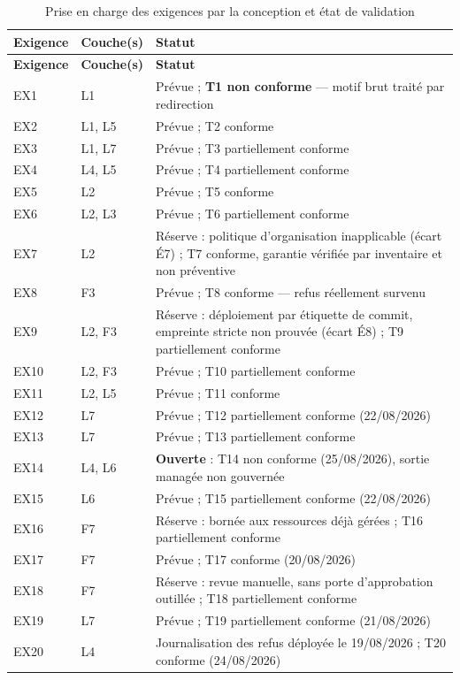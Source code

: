 \begingroup
\small
\setlength{\tabcolsep}{4pt}
\setlength{\LTpre}{4pt}
\setlength{\LTpost}{4pt}
\begin{longtable}{|P{1.3cm}|P{1.9cm}|P{11.8cm}|}
\caption[Prise en charge des exigences]{Prise en charge des exigences par la conception et état de validation}
\label{tab:couverture-exigences} \\
\hline
\textbf{Exigence} & \textbf{Couche(s)} & \textbf{Statut} \\
\hline
\endfirsthead
\hline
\textbf{Exigence} & \textbf{Couche(s)} & \textbf{Statut} \\
\hline
\endhead
EX1 & L1 & Prévue ; \textbf{T1 non conforme} --- motif brut traité par redirection \\ \hline
EX2 & L1, L5 & Prévue ; T2 conforme \\ \hline
EX3 & L1, L7 & Prévue ; T3 partiellement conforme \\ \hline
EX4 & L4, L5 & Prévue ; T4 partiellement conforme \\ \hline
EX5 & L2 & Prévue ; T5 conforme \\ \hline
EX6 & L2, L3 & Prévue ; T6 partiellement conforme \\ \hline
EX7 & L2 & Réserve : politique d'organisation inapplicable (écart É7) ; T7 conforme, garantie vérifiée par inventaire et non préventive \\ \hline
EX8 & F3 & Prévue ; T8 conforme --- refus réellement survenu \\ \hline
EX9 & L2, F3 & Réserve : déploiement par étiquette de commit, empreinte stricte non prouvée (écart É8) ; T9 partiellement conforme \\ \hline
EX10 & L2, F3 & Prévue ; T10 partiellement conforme \\ \hline
EX11 & L2, L5 & Prévue ; T11 conforme \\ \hline
EX12 & L7 & Prévue ; T12 partiellement conforme (22/08/2026) \\ \hline
EX13 & L7 & Prévue ; T13 partiellement conforme \\ \hline
EX14 & L4, L6 & \textbf{Ouverte} : T14 non conforme (25/08/2026), sortie managée non gouvernée \\ \hline
EX15 & L6 & Prévue ; T15 partiellement conforme (22/08/2026) \\ \hline
EX16 & F7 & Réserve : bornée aux ressources déjà gérées ; T16 partiellement conforme \\ \hline
EX17 & F7 & Prévue ; T17 conforme (20/08/2026) \\ \hline
EX18 & F7 & Réserve : revue manuelle, sans porte d'approbation outillée ; T18 partiellement conforme \\ \hline
EX19 & L7 & Prévue ; T19 partiellement conforme (21/08/2026) \\ \hline
EX20 & L4 & Journalisation des refus déployée le 19/08/2026 ; T20 conforme (24/08/2026) \\
\hline
\end{longtable}
\endgroup

